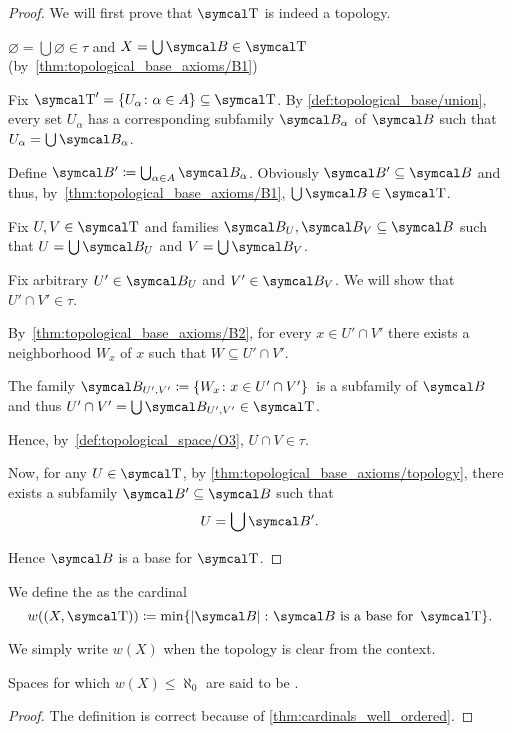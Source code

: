 \begin{proof}
  We will first prove that \( \CT \) is indeed a topology.

  \begin{description}
     \( \varnothing = \bigcup \varnothing \in \tau \) and \( X = \bigcup \Cal{B} \in \CT \) (by~\ref{thm:topological_base_axioms/B1})

     Fix \( \CT' = \{ U_\alpha \colon \alpha \in A \} \subseteq \CT \). By \cref{def:topological_base/union}, every set \( U_\alpha \) has a corresponding subfamily \( \Cal{B}_\alpha \) of \( \Cal{B} \) such that \( U_\alpha = \bigcup \Cal{B}_\alpha \).

    Define \( \Cal{B}' \coloneqq \bigcup_{\alpha \in A} \Cal{B}_\alpha \). Obviously \( \Cal{B}' \subseteq \Cal{B} \) and thus, by~\ref{thm:topological_base_axioms/B1}, \( \bigcup \Cal{B} \in \CT \).

     Fix \( U, V \in \CT \) and families \( \Cal{B}_U, \Cal{B}_V \subseteq \Cal{B} \) such that \( U = \bigcup \Cal{B}_U \) and \( V = \bigcup \Cal{B}_V \).

    Fix arbitrary \( U' \in \Cal{B}_U \) and \( V' \in \Cal{B}_V \). We will show that \( U' \cap V' \in \tau \).

    By~\ref{thm:topological_base_axioms/B2}, for every \( x \in U' \cap V' \) there exists a neighborhood \( W_x \) of \( x \) such that \( W \subseteq U' \cap V' \).

    The family \( \Cal{B}_{U',V'} \coloneqq \{ W_x \colon x \in U' \cap V' \} \)~\AOC is a subfamily of \( \Cal{B} \) and thus \( U' \cap V' = \bigcup \Cal{B}_{U',V'} \in \CT \).

    Hence, by~\ref{def:topological_space/O3}, \( U \cap V \in \tau \).
  \end{description}

  Now, for any \( U \in \CT \), by \cref{thm:topological_base_axioms/topology}, there exists a subfamily \( \Cal{B}' \subseteq \Cal{B} \) such that
  \begin{equation*}
    U = \bigcup \Cal{B}'.
  \end{equation*}

  Hence \( \Cal{B} \) is a base for \( \CT \).
\end{proof}

\begin{definition}\label{def:topological_space_weight}
  We define the  as the cardinal
  \begin{equation*}
    w((X, \CT)) \coloneqq \min \{ \Abs{\Cal{B}} \colon \Cal{B} \text{ is a base for } \CT \}.
  \end{equation*}

  We simply write \( w(X) \) when the topology is clear from the context.

  Spaces for which \( w(X) \leq \aleph_0 \) are said to be .
\end{definition}
\begin{proof}
  The definition is correct because of \cref{thm:cardinals_well_ordered}.
\end{proof}

